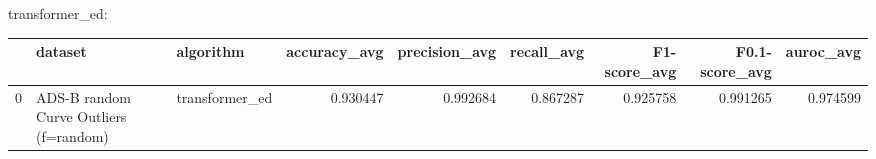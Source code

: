 transformer_ed:

\begin{tabular}{rllrrrrrr}
\hline
    & dataset                                & algorithm      &   accuracy\_avg &   precision\_avg &   recall\_avg &   F1-score\_avg &   F0.1-score\_avg &   auroc\_avg \\
\hline
  0 & ADS-B random Curve Outliers (f=random) & transformer\_ed &       0.930447 &        0.992684 &     0.867287 &       0.925758 &         0.991265 &    0.974599 \\
\hline
\end{tabular}

